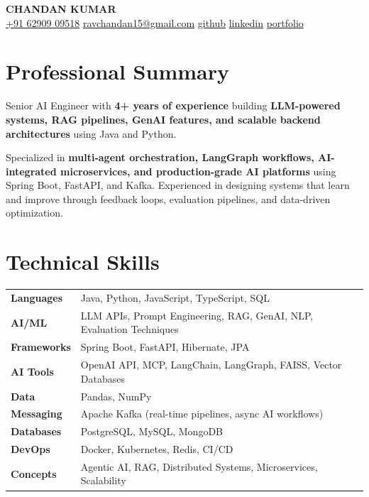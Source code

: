 \documentclass[10pt, letterpaper]{article}
\begin{document}
\begin{center}
{\LARGE\bfseries\color{primary} CHANDAN KUMAR}\\[4pt]

\small\color{subtle}
\href{tel:+916290909518}{+91 62909 09518} \quad
\href{mailto:ravchandan15@gmail.com}{ravchandan15@gmail.com} \quad
\href{https://github.com/RavSinghChandan}{github} \quad
\href{https://linkedin.com}{linkedin} \quad
\href{https://chandan-kumar-ai-engineer.vercel.app/}{portfolio}
\end{center}

\vspace{-2pt}

\section{Professional Summary}

\noindent Senior AI Engineer with \textbf{4+ years of experience} building \textbf{LLM-powered systems, RAG pipelines, GenAI features, and scalable backend architectures} using Java and Python.

\vspace{3pt}

\noindent Specialized in \textbf{multi-agent orchestration, LangGraph workflows, AI-integrated microservices, and production-grade AI platforms} using Spring Boot, FastAPI, and Kafka. Experienced in designing systems that learn and improve through feedback loops, evaluation pipelines, and data-driven optimization.

\section{Technical Skills}

\begin{tabularx}{\textwidth}{@{} l X @{}}
\textbf{Languages} & Java, Python, JavaScript, TypeScript, SQL \\[2pt]
\textbf{AI/ML} & LLM APIs, Prompt Engineering, RAG, GenAI, NLP, Evaluation Techniques \\[2pt]
\textbf{Frameworks} & Spring Boot, FastAPI, Hibernate, JPA \\[2pt]
\textbf{AI Tools} & OpenAI API, MCP, LangChain, LangGraph, FAISS, Vector Databases \\[2pt]
\textbf{Data} & Pandas, NumPy \\[2pt]
\textbf{Messaging} & Apache Kafka (real-time pipelines, async AI workflows) \\[2pt]
\textbf{Databases} & PostgreSQL, MySQL, MongoDB \\[2pt]
\textbf{DevOps} & Docker, Kubernetes, Redis, CI/CD \\[2pt]
\textbf{Concepts} & Agentic AI, RAG, Distributed Systems, Microservices, Scalability \\
\end{tabularx}
\end{document}
